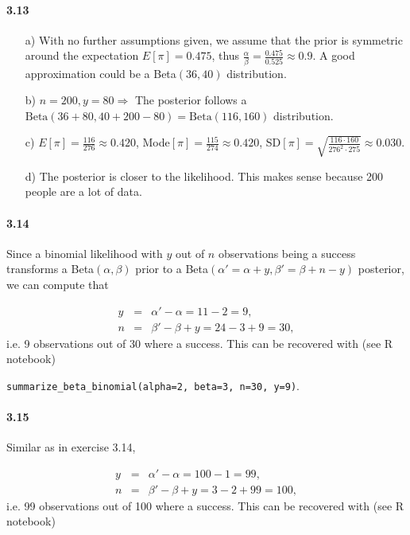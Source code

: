 \documentclass[fontsize=11pt,DIV=18,parskip=half]{scrartcl}
\begin{document}
\paragraph{3.13}
\begin{enumerate}
\item[a)] With no further assumptions given, we assume that the prior is symmetric around the expectation $E[\pi] = 0.475$, thus $\frac{\alpha}{\beta} = \frac{0.475}{0.525} \approx 0.9$. A good approximation could be a Beta$(36,40)$ distribution.
\item[b)] $n=200, y=80 \Rightarrow$ The posterior follows a $\text{Beta}(36 + 80, 40 + 200 - 80)=\text{Beta}(116, 160)$ distribution.
\item[c)] $E[\pi] = \frac{116}{276} \approx 0.420$, Mode$[\pi] = \frac{115}{274} \approx 0.420$, SD$[\pi] = \sqrt{\frac{116\cdot160}{276^2\cdot275}} \approx 0.030$.
\item[d)] The posterior is closer to the likelihood. This makes sense because 200 people are a lot of data.
\end{enumerate}

\paragraph{3.14} \mbox{}

Since a binomial likelihood with $y$ out of $n$ observations being a success transforms a Beta$(\alpha, \beta)$ prior to a Beta$(\alpha'=\alpha+y, \beta'=\beta+n-y)$ posterior, we can compute that 

\begin{eqnarray*}
y &=&\alpha'-\alpha=11-2=9,\\
n &=& \beta'-\beta+y = 24-3+9=30,
\end{eqnarray*}
i.e. 9 observations out of 30 where a success. This can be recovered with (see R notebook)

\begin{center}
	\texttt{summarize\_beta\_binomial(alpha=2, beta=3, n=30, y=9)}.
\end{center}

\paragraph{3.15} \mbox{}

Similar as in exercise 3.14, 

\begin{eqnarray*}
y &=&\alpha'-\alpha=100-1=99,\\
n &=& \beta'-\beta+y = 3-2+99=100,
\end{eqnarray*}
i.e. 99 observations out of 100 where a success. This can be recovered with (see R notebook)
\end{document}
